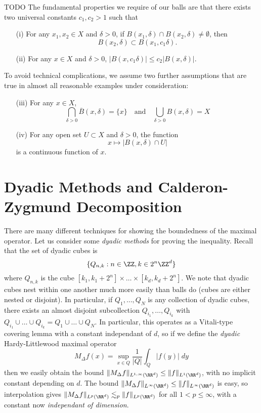 \newpage

TODO  The fundamental properties we require of our balls are that there exists two universal constants $c_1,c_2 > 1$ such that
%
\begin{enumerate}
  \item[(i)] For any $x_1,x_2 \in X$ and $\delta > 0$, if $B(x_1,\delta) \cap B(x_2,\delta) \neq \emptyset$, then
  \[ B(x_2,\delta) \subset B(x_1,c_1 \delta). \]

  \item[(ii)] For any $x \in X$ and $\delta > 0$, $|B(x,c_1\delta)| \leq c_2 |B(x,\delta)|$.
\end{enumerate}
%
To avoid technical complications, we assume two further assumptions that are true in almost all reasonable examples under consideration:
%
\begin{enumerate}
  \item[(iii)] For any $x \in X$,
  \[ \bigcap_{\delta > 0} \overline{B}(x,\delta) = \{ x \} \quad\text{and}\quad \bigcup_{\delta > 0} B(x,\delta) = X \]

  \item[(iv)] For any open set $U \subset X$ and $\delta > 0$, the function
  \[ x \mapsto |B(x,\delta) \cap U| \]
  is a continuous function of $x$.
\end{enumerate}

\newpage





\section{Dyadic Methods and Calderon-Zygmund Decomposition}

There are many different techniques for showing the boundedness of the maximal operator. Let us consider some \emph{dyadic methods} for proving the inequality. Recall that the set of dyadic cubes is
%
\[ \{ Q_{n,k} : n \in \ZZ, k \in 2^n \ZZ^d \} \]
%
where $Q_{n,k}$ is the cube $[k_1, k_1 + 2^n] \times \dots \times [k_d, k_d + 2^n]$. We note that dyadic cubes nest within one another much more easily than balls do (cubes are either nested or disjoint). In particular, if $Q_1,\dots,Q_N$ is any collection of dyadic cubes, there exists an almost disjoint subcollection $Q_{i_1}, \dots, Q_{i_k}$ with $Q_{i_1} \cup \dots \cup Q_{i_k} = Q_1 \cup \dots \cup Q_N$. In particular, this operates as a Vitali-type covering lemma with a constant independant of $d$, so if we define the \emph{dyadic} Hardy-Littlewood maximal operator
%
\[ M_\Delta f(x) = \sup_{x \in Q} \frac{1}{|Q|} \int_Q |f(y)|\; dy \]
%
then we easily obtain the bound $\| M_\Delta f \|_{L^{1,\infty}(\RR^d)} \leq \| f \|_{L^1(\RR^d)}$, with no implicit constant depending on $d$. The bound $\| M_\Delta f \|_{L^\infty(\RR^d)} \leq \| f \|_{L^\infty(\RR^d)}$ is easy, so interpolation gives $\| M_\Delta f \|_{L^p(\RR^d)} \lesssim_p \| f \|_{L^p(\RR^d)}$ for all $1 < p \leq \infty$, with a constant now \emph{independant of dimension}.

